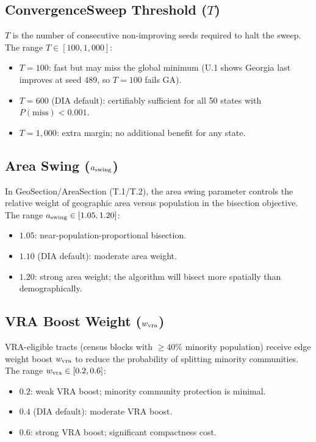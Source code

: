 \subsection{ConvergenceSweep Threshold ($T$)}

$T$ is the number of consecutive non-improving seeds required to halt
the sweep.
The range $T \in [100, 1{,}000]$:
\begin{itemize}
\item $T = 100$: fast but may miss the global minimum (U.1 shows
      Georgia last improves at seed 489, so $T = 100$ fails GA).
\item $T = 600$ (DIA default): certifiably sufficient for all 50 states
      with $P(\text{miss}) < 0.001$.
\item $T = 1{,}000$: extra margin; no additional benefit for any state.
\end{itemize}

\subsection{Area Swing ($a_{\mathrm{swing}}$)}

In GeoSection/AreaSection (T.1/T.2), the area swing parameter controls
the relative weight of geographic area versus population in the bisection
objective.
The range $a_{\mathrm{swing}} \in [1.05, 1.20]$:
\begin{itemize}
\item $1.05$: near-population-proportional bisection.
\item $1.10$ (DIA default): moderate area weight.
\item $1.20$: strong area weight; the algorithm will bisect more
      spatially than demographically.
\end{itemize}

\subsection{VRA Boost Weight ($w_{\mathrm{vra}}$)}

VRA-eligible tracts (census blocks with $\geq 40\%$ minority population)
receive edge weight boost $w_{\mathrm{vra}}$ to reduce the probability of splitting
minority communities.
The range $w_{\mathrm{vra}} \in [0.2, 0.6]$:
\begin{itemize}
\item $0.2$: weak VRA boost; minority community protection is minimal.
\item $0.4$ (DIA default): moderate VRA boost.
\item $0.6$: strong VRA boost; significant compactness cost.
\end{itemize}
